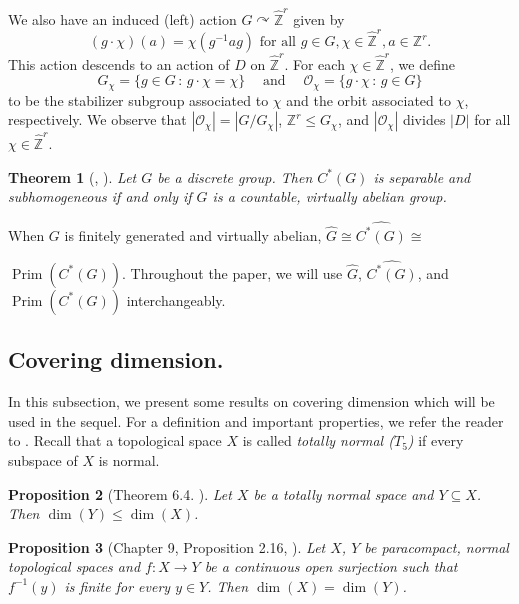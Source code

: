 \documentclass[11pt, twoside]{amsart}
\newcommand{\te}[1]{\operatorname{#1}}
\newcommand{\Prim}{\operatorname{Prim}}
\newcommand{\mc}{\mathcal}
\newcommand{\wh}{\widehat}
\newtheorem{thm}{Theorem}[section]
\newtheorem{prop}[thm]{Proposition}
\theoremstyle{definition}
\newcommand{\B}{\mathbb}
\newcommand{\Z}{\B{Z}}
\begin{document}
We also have an induced (left) action $G\curvearrowright\wh{\Z}^r$ given by 
\[(g\cdot \chi)(a)=\chi(g^{-1}ag)\text{ for all }g\in G, \chi\in\wh{\Z}^r, a\in \Z^r.\]
This action descends to an action of $D$ on $\widehat{\Z}^r$. For each $\chi\in \wh{\Z}^r$, we define
\begin{equation}\label{eqn:stabilizer_and_orbit}
G_{\chi}=\{g\in G\,\colon\,g\cdot \chi=\chi\}\quad\te{ and }\quad\mc{O}_{\chi}=\{g\cdot\chi\,\colon\,g\in G\}
\end{equation}
to be the stabilizer subgroup associated to $\chi$ and the orbit associated to $\chi$, respectively. We observe that $|\mc{O}_{\chi}|={|G/ G_{\chi}|}$, $\Z^r\leq G_{\chi}$, and $|\mc{O}_{\chi}|$ divides $|D|$ for all $\chi\in\wh{\Z}^r$. \par

\begin{thm}[\cite{Moo72}, \cite{Dix77}]\label{note:subhomogeneous}
  Let $G$ be a discrete group. Then $C^*(G)$ is separable and subhomogeneous if and only if $G$ is a countable, virtually abelian group. 
\end{thm}

When $G$ is finitely generated and virtually abelian, $\wh{G}\cong\widehat{C^*(G)}\cong$ \par\noindent$ \Prim(C^*(G))$. Throughout the paper, we will use $\wh{G}$, $\widehat{C^*(G)}$, and $\Prim(C^*(G))$ interchangeably.

\subsection{Covering dimension.}
In this subsection, we present some results on covering dimension which will be used in the sequel. For a definition and important properties, we refer the reader to \cite{Pea75}. Recall that a topological space $X$ is called \emph{totally normal ($T_5$)} if every subspace of $X$ is normal.
\begin{prop}[Theorem 6.4. \cite{Pea75}]\label{monot_covering_dim}
    Let $X$ be a totally normal space and $Y\subseteq X$. Then $\dim(Y)\leq \dim(X)$.
\end{prop}
\begin{prop}[Chapter 9, Proposition 2.16, \cite{Pea75}]\label{dim_of_quotient}
     Let $X$, $Y$ be paracompact, normal topological spaces and $f:X\rightarrow Y$ be a continuous open surjection such that $f^{-1}(y)$ is finite for every $y\in Y$. Then $\dim(X)=\dim(Y)$.
 \end{prop}
 
\end{document}
